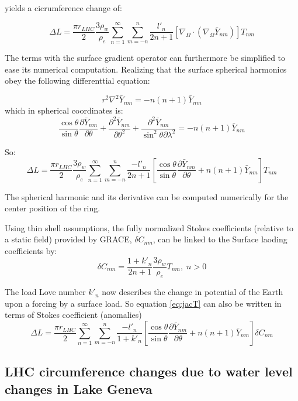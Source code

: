 \documentclass[a4paper,10pt,twoside,openany]{article}
\begin{document}
yields a cicrumference change of:

\begin{equation}
  \Delta L =\frac{\pi r_{LHC}}{2} \frac{3\rho_{w}}{\rho_{e}}\sum_{n=1}^{\infty}\sum_{m=-n}^{n}\frac{l'_{n}}{2n+1}\left[\nabla_{\Omega} \cdot
  (\nabla_{\Omega} \bar{Y}_{nm})\right]T_{nm}
\end{equation}

The terms with the surface gradient operator can furthermore be
simplified to ease its numerical computation. Realizing that the
surface spherical harmonics obey the following differenttial equation:

\begin{equation}
  r^{2}\nabla^{2} \bar{Y}_{nm}= -n(n+1)\bar{Y}_{nm}
\end{equation}
which in spherical coordinates is:
\begin{equation}
  \frac{\cos\theta}{\sin\theta}\frac{\partial \bar{Y}_{nm}}{\partial
    \theta}+\frac{\partial^{2}\bar{Y}_{nm}}{\partial\theta^{2}}+\frac{\partial^{2} \bar{Y}_{nm}}{\sin^{2}\theta\partial \lambda^{2}}= -n(n+1)\bar{Y}_{nm}
\end{equation}

So:
\begin{equation}
  \Delta L =\frac{\pi r_{LHC}}{2}
  \frac{3\rho_{w}}{\rho_{e}}\sum_{n=1}^{\infty}\sum_{m=-n}^{n}\frac{-l'_{n}}{2n+1}\left[
    \frac{\cos\theta}{\sin\theta}\frac{\partial \bar{Y}_{nm}}{\partial
      \theta} +n(n+1)\bar{Y}_{nm}\right]T_{nm}
  \label{eq:jacT}
\end{equation}



The spherical harmonic and its derivative can be computed numerically
for the center position of the ring.

Using thin shell assumptions, the fully normalized Stokes coefficients (relative to a
static field) provided by
GRACE, $\delta C_{nm}$, can be linked to the Surface laoding
coefficients by:
\begin{equation}
\delta C_{nm} = \frac{1+k'_{n}}{2n+1}\frac{3\rho_{w}}{\rho_{e}}
T_{nm},\; n>0
\end{equation}

The load Love number $k'_{n}$ now describes the change in potential of
the Earth upon a forcing by a surface load.
So equation \ref{eq:jacT} can also be written in terms of Stokes
coefficient (anomalies)
\begin{equation}
  \Delta L =\frac{\pi r_{LHC}}{2}
  \sum_{n=1}^{\infty}\sum_{m=-n}^{n}\frac{-l'_{n}}{1+k'_{n}}\left[
    \frac{\cos\theta}{\sin\theta}\frac{\partial \bar{Y}_{nm}}{\partial
    \theta} +n(n+1)\bar{Y}_{nm}\right]\delta C_{nm}
\label{eq:jacpot}
\end{equation}
















\subsection{LHC circumference changes due to water level changes in Lake Geneva}



%
%
\end{document}
